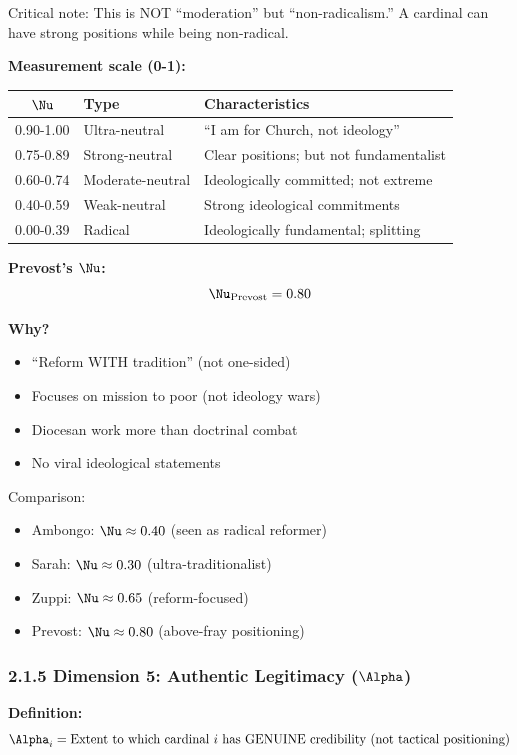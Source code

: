 \documentclass[11pt]{article}
\begin{document}
Critical note: This is NOT ``moderation'' but ``non-radicalism.'' A cardinal can have strong positions while being non-radical.

\textbf{Measurement scale (0-1):}

\begin{table}[h]
\centering
\begin{tabular}{|c|l|l|}
\hline
$\Nu$ & \textbf{Type} & \textbf{Characteristics} \\
\hline
0.90-1.00 & Ultra-neutral & ``I am for Church, not ideology'' \\
0.75-0.89 & Strong-neutral & Clear positions; but not fundamentalist \\
0.60-0.74 & Moderate-neutral & Ideologically committed; not extreme \\
0.40-0.59 & Weak-neutral & Strong ideological commitments \\
0.00-0.39 & Radical & Ideologically fundamental; splitting \\
\hline
\end{tabular}
\end{table}

\textbf{Prevost's $\Nu$:}
$$\Nu_{\text{Prevost}} = 0.80$$

\textbf{Why?}
\begin{itemize}
\item ``Reform WITH tradition'' (not one-sided)
\item Focuses on mission to poor (not ideology wars)
\item Diocesan work more than doctrinal combat
\item No viral ideological statements
\end{itemize}

Comparison:
\begin{itemize}
\item Ambongo: $\Nu \approx 0.40$ (seen as radical reformer)
\item Sarah: $\Nu \approx 0.30$ (ultra-traditionalist)
\item Zuppi: $\Nu \approx 0.65$ (reform-focused)
\item Prevost: $\Nu \approx 0.80$ (above-fray positioning)
\end{itemize}

\subsubsection{2.1.5 Dimension 5: Authentic Legitimacy ($\Alpha$)}

\textbf{Definition:}
$$\Alpha_i = \text{Extent to which cardinal } i \text{ has GENUINE credibility (not tactical positioning)}$$
\end{document}
